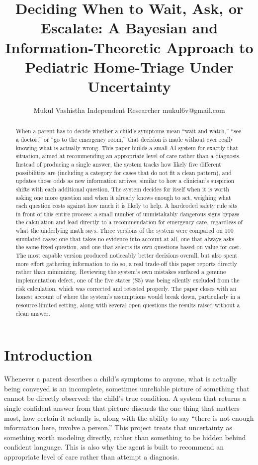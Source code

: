 \documentclass{article}
\title{Deciding When to Wait, Ask, or Escalate: A Bayesian and Information-Theoretic Approach to Pediatric Home-Triage Under Uncertainty}
\author{
    Mukul Vashistha
    \affiliations
    Independent Researcher
    \emails
    mukul6v@gmail.com
}
\begin{document}
\maketitle

\begin{abstract}
When a parent has to decide whether a child's symptoms mean ``wait and
watch,'' ``see a doctor,'' or ``go to the emergency room,'' that
decision is made without ever really knowing what is actually wrong.
This paper builds a small AI system for exactly that situation, aimed at
recommending an appropriate level of care rather than a diagnosis.
Instead of producing a single answer, the system tracks how likely five
different possibilities are (including a category for cases that do not
fit a clean pattern), and updates those odds as new information arrives,
similar to how a clinician's suspicion shifts with each additional
question. The system decides for itself when it is worth asking one more
question and when it already knows enough to act, weighing what each
question costs against how much it is likely to help. A hardcoded safety
rule sits in front of this entire process: a small number of
unmistakably dangerous signs bypass the calculation and lead directly to
a recommendation for emergency care, regardless of what the underlying
math says. Three versions of the system were compared on 100 simulated
cases: one that takes no evidence into account at all, one that always
asks the same fixed question, and one that selects its own questions
based on value for cost. The most capable version produced noticeably
better decisions overall, but also spent more effort gathering
information to do so, a real trade-off this paper reports directly
rather than minimizing. Reviewing the system's own mistakes surfaced a
genuine implementation defect, one of the five states (S5) was being
silently excluded from the risk calculation, which was corrected and
retested properly. The paper closes with an honest account of where the
system's assumptions would break down, particularly in a
resource-limited setting, along with several open questions the results
raised without a clean answer.
\end{abstract}

\hypertarget{introduction}{%
\section{Introduction}\label{introduction}}

Whenever a parent describes a child's symptoms to anyone, what is
actually being conveyed is an incomplete, sometimes unreliable picture
of something that cannot be directly observed: the child's true
condition. A system that returns a single confident answer from that
picture discards the one thing that matters most, how certain it
actually is, along with the ability to say ``there is not enough
information here, involve a person.'' This project treats that
uncertainty as something worth modeling directly, rather than something
to be hidden behind confident language. This is also why the agent is
built to recommend an appropriate level of care rather than attempt a
diagnosis.
\end{document}
